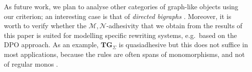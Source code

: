 \documentclass[runningheads,envcountsect]{lmcs}
\newcommand{\catname}[1]{\mathbf{#1}}
\newcommand{\tg}[0]{\catname{TG}_{\Sigma}}
\theoremstyle{plain}
\theoremstyle{definition}
\begin{document}
As future work, we plan to analyse other categories of graph-like objects using our criterion; an interesting case is that of \emph{directed bigraphs} \cite{gm:directedbig,bgm:calco09,bmp:sac}.
Moreover, it is worth to verify whether the $\mathcal{M}, \mathcal{N}$-adhesivity that we obtain from the results of this paper is suited for modelling specific rewriting systems, e.g.~based on the DPO approach.  As an example, $\tg$ is quasiadhesive but this does not suffice in most applications, because the rules are often spans of monomorphisms, and not of regular monos \cite{corradini2005term}. 

%


 
\end{document}
